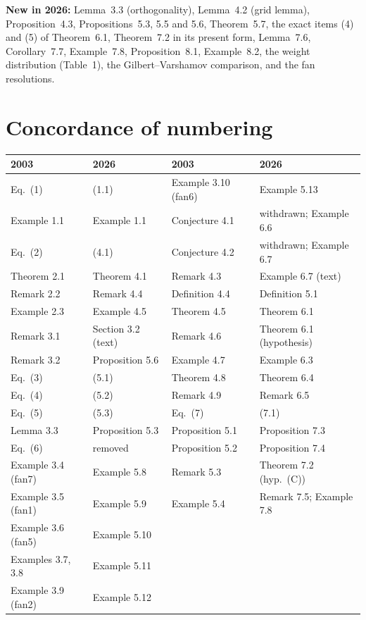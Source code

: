 \documentclass[12pt,letterpaper]{article}
\begin{document}
\textbf{New in 2026:} Lemma~3.3 (orthogonality), Lemma~4.2 (grid lemma),
Proposition~4.3, Propositions~5.3, 5.5 and 5.6, Theorem~5.7, the exact
items (4) and (5) of Theorem~6.1, Theorem~7.2 in its present form,
Lemma~7.6, Corollary~7.7, Example~7.8, Proposition~8.1, Example~8.2, the
weight distribution (Table~1), the Gilbert--Varshamov comparison, and the
fan resolutions.

\section{Concordance of numbering}

\begin{longtable}{@{}ll|ll@{}}
\toprule
2003 & 2026 & 2003 & 2026\\ \midrule
\endhead
Eq.~(1) & (1.1) & Example 3.10 (fan6) & Example 5.13\\
Example 1.1 & Example 1.1 & Conjecture 4.1 & withdrawn; Example 6.6\\
Eq.~(2) & (4.1) & Conjecture 4.2 & withdrawn; Example 6.7\\
Theorem 2.1 & Theorem 4.1 & Remark 4.3 & Example 6.7 (text)\\
Remark 2.2 & Remark 4.4 & Definition 4.4 & Definition 5.1\\
Example 2.3 & Example 4.5 & Theorem 4.5 & Theorem 6.1\\
Remark 3.1 & Section 3.2 (text) & Remark 4.6 & Theorem 6.1 (hypothesis)\\
Remark 3.2 & Proposition 5.6 & Example 4.7 & Example 6.3\\
Eq.~(3) & (5.1) & Theorem 4.8 & Theorem 6.4\\
Eq.~(4) & (5.2) & Remark 4.9 & Remark 6.5\\
Eq.~(5) & (5.3) & Eq.~(7) & (7.1)\\
Lemma 3.3 & Proposition 5.3 & Proposition 5.1 & Proposition 7.3\\
Eq.~(6) & removed & Proposition 5.2 & Proposition 7.4\\
Example 3.4 (fan7) & Example 5.8 & Remark 5.3 & Theorem 7.2 (hyp.\ (C))\\
Example 3.5 (fan1) & Example 5.9 & Example 5.4 & Remark 7.5; Example 7.8\\
Example 3.6 (fan5) & Example 5.10 & & \\
Examples 3.7, 3.8 & Example 5.11 & & \\
Example 3.9 (fan2) & Example 5.12 & & \\
\bottomrule
\end{longtable}
\end{document}
